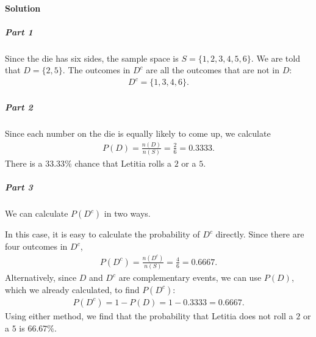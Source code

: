 \documentclass[letterpaper,10pt,english]{jupyterBook}
\begin{document}
\paragraph{Solution}
\label{\detokenize{Ch3 Probability/3.4 Addition Rules and Mutually Exclusive Events:id11}}

\subparagraph{Part 1}
\label{\detokenize{Ch3 Probability/3.4 Addition Rules and Mutually Exclusive Events:id12}}
\sphinxAtStartPar
Since the die has six sides, the sample space is \(S = \{1, 2, 3, 4, 5, 6\}\). We are told that \(D = \{2, 5\}\). The outcomes in \(D^c\) are all the outcomes that are not in \(D\):
\begin{equation*}
\begin{split} D^c = \{1, 3, 4, 6\}. \end{split}
\end{equation*}

\subparagraph{Part 2}
\label{\detokenize{Ch3 Probability/3.4 Addition Rules and Mutually Exclusive Events:id13}}
\sphinxAtStartPar
Since each number on the die is equally likely to come up, we calculate
\begin{equation*}
\begin{split} P(D) = \frac{n(D)}{n(S)} = \frac{2}{6} = 0.3333. \end{split}
\end{equation*}
\sphinxAtStartPar
There is a \(33.33\%\) chance that Letitia rolls a \(2\) or a \(5\).


\subparagraph{Part 3}
\label{\detokenize{Ch3 Probability/3.4 Addition Rules and Mutually Exclusive Events:id14}}
\sphinxAtStartPar
We can calculate \(P(D^c)\) in two ways.

\sphinxAtStartPar
In this case, it is easy to calculate the probability of \(D^c\) directly. Since there are four outcomes in \(D^c\),
\begin{equation*}
\begin{split} P(D^c) = \frac{n(D^c)}{n(S)} = \frac{4}{6} = 0.6667. \end{split}
\end{equation*}
\sphinxAtStartPar
Alternatively, since \(D\) and \(D^c\) are complementary events, we can use \(P(D)\), which we already calculated, to find \(P(D^c)\):
\begin{equation*}
\begin{split} P(D^c) = 1 - P(D) = 1 - 0.3333 = 0.6667. \end{split}
\end{equation*}
\sphinxAtStartPar
Using either method, we find that the probability that Letitia does not roll a \(2\) or a \(5\) is \(66.67\%\).
\end{document}
